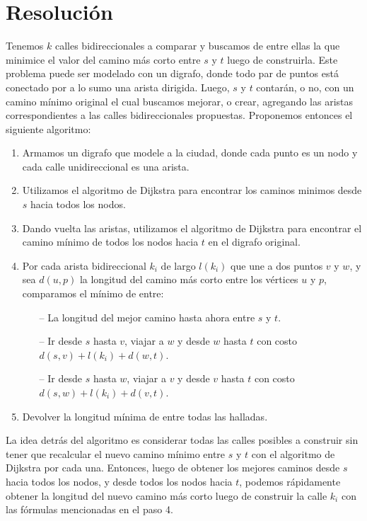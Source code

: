 \section{Resolución}

Tenemos $k$ calles bidireccionales a comparar y buscamos de entre ellas la que minimice el valor del camino más corto entre $s$ y $t$ luego de construirla. Este problema puede ser modelado con un digrafo, donde todo par de puntos está conectado por a lo sumo una arista dirigida. Luego, $s$ y $t$ contarán, o no, con un camino mínimo original el cual buscamos mejorar, o crear, agregando las aristas correspondientes a las calles bidireccionales propuestas. Proponemos entonces el siguiente algoritmo:

\begin{enumerate}
    \item Armamos un digrafo que modele a la ciudad, donde cada punto es un nodo y cada calle unidireccional es una arista. 
    \item Utilizamos el algoritmo de Dijkstra para encontrar los caminos minimos desde $s$ hacia todos los nodos.
    \item Dando vuelta las aristas, utilizamos el algoritmo de Dijkstra para encontrar el camino mínimo de todos los nodos hacia $t$ en el digrafo original.
    \item Por cada arista bidireccional $k_i$ de largo $l(k_i)$ que une a dos puntos $v$ y $w$, y sea $d(u,p)$ la longitud del camino más corto entre los vértices $u$ y $p$, comparamos el mínimo de entre: 
    \begin{itemize}
        \item[--] La longitud del mejor camino hasta ahora entre $s$ y $t$.
        \item[--] Ir desde $s$ hasta $v$, viajar a $w$ y desde $w$ hasta $t$ con costo $d(s,v) + l(k_i) + d(w,t)$.
        \item[--] Ir desde $s$ hasta $w$, viajar a $v$ y desde $v$ hasta $t$ con costo $d(s,w) + l(k_i) + d(v,t)$.
    \end{itemize}
    \item Devolver la longitud mínima de entre todas las halladas.
\end{enumerate}


La idea detrás del algoritmo es considerar todas las calles posibles a construir sin tener que recalcular el nuevo camino mínimo entre $s$ y $t$ con el algoritmo de Dijkstra por cada una. Entonces, luego de obtener los mejores caminos desde $s$ hacia todos los nodos, y desde todos los nodos hacia $t$, podemos rápidamente obtener la longitud del nuevo camino más corto luego de construir la calle $k_i$ con las fórmulas mencionadas en el paso 4. 

